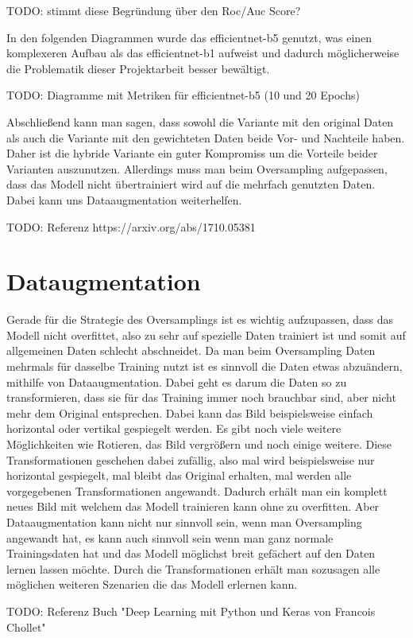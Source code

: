 \documentclass[11pt, a4paper]{article}
\begin{document}
TODO: stimmt diese Begründung über den Roc/Auc Score?

In den folgenden Diagrammen wurde das efficientnet-b5 genutzt, was einen komplexeren Aufbau als das efficientnet-b1 aufweist und dadurch möglicherweise die Problematik dieser Projektarbeit besser bewältigt.

TODO: Diagramme mit Metriken für efficientnet-b5 (10 und 20 Epochs)

Abschließend kann man sagen, dass sowohl die Variante mit den original Daten als auch die Variante mit den gewichteten Daten beide Vor- und Nachteile haben. Daher ist die hybride Variante ein guter Kompromiss um die Vorteile beider Varianten auszunutzen. Allerdings muss man beim Oversampling aufgepassen, dass das Modell nicht übertrainiert wird auf die mehrfach genutzten Daten. Dabei kann uns Dataaugmentation weiterhelfen.

TODO: Referenz https://arxiv.org/abs/1710.05381

\section{Dataugmentation}
Gerade für die Strategie des Oversamplings ist es wichtig aufzupassen, dass das Modell nicht overfittet, also zu sehr auf spezielle Daten trainiert ist und somit auf allgemeinen Daten schlecht abschneidet. Da man beim Oversampling Daten mehrmals für dasselbe Training nutzt ist es sinnvoll die Daten etwas abzuändern, mithilfe von Dataaugmentation. Dabei geht es darum die Daten so zu transformieren, dass sie für das Training immer noch brauchbar sind, aber nicht mehr dem Original entsprechen. Dabei kann das Bild beispielsweise einfach horizontal oder vertikal gespiegelt werden. Es gibt noch viele weitere Möglichkeiten wie Rotieren, das Bild vergrößern und noch einige weitere. Diese Transformationen geschehen dabei zufällig, also mal wird beispielsweise nur horizontal gespiegelt, mal bleibt das Original erhalten, mal werden alle vorgegebenen Transformationen angewandt. Dadurch erhält man ein komplett neues Bild mit welchem das Modell trainieren kann ohne zu overfitten. Aber Dataaugmentation kann nicht nur sinnvoll sein, wenn man Oversampling angewandt hat, es kann auch sinnvoll sein wenn man ganz normale Trainingsdaten hat und das Modell möglichst breit gefächert auf den Daten lernen lassen möchte. Durch die Transformationen erhält man sozusagen alle möglichen weiteren Szenarien die das Modell erlernen kann.

TODO: Referenz Buch "Deep Learning mit Python und Keras von Francois Chollet"
\end{document}
